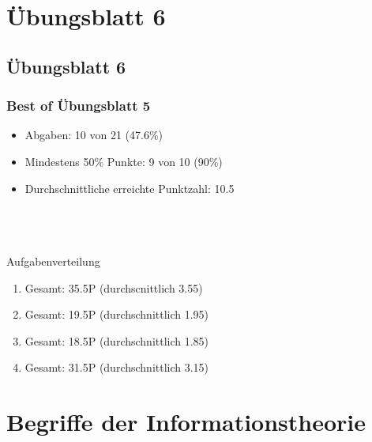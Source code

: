 




\section{Übungsblatt 6}
\subsection{Übungsblatt 6}

\begin{frame}
\frametitle{Best of Übungsblatt 5}
\begin{itemize}
	\item Abgaben: 10 von 21 (47.6\%)
	\item Mindestens 50\% Punkte: 9 von 10 (90\%)
	\item Durchschnittliche erreichte Punktzahl: 10.5
\end{itemize}~\\~\\~\\
Aufgabenverteilung
\begin{enumerate}[{A}ufg{a}be 1:]
	\item Gesamt: 35.5P (durchscnittlich 3.55)
	\item Gesamt: 19.5P (durchschnittlich 1.95)
	\item Gesamt: 18.5P (durchschnittlich 1.85)
	\item Gesamt: 31.5P (durchschnittlich 3.15)
\end{enumerate}
\end{frame}

\section{Begriffe der Informationstheorie}
